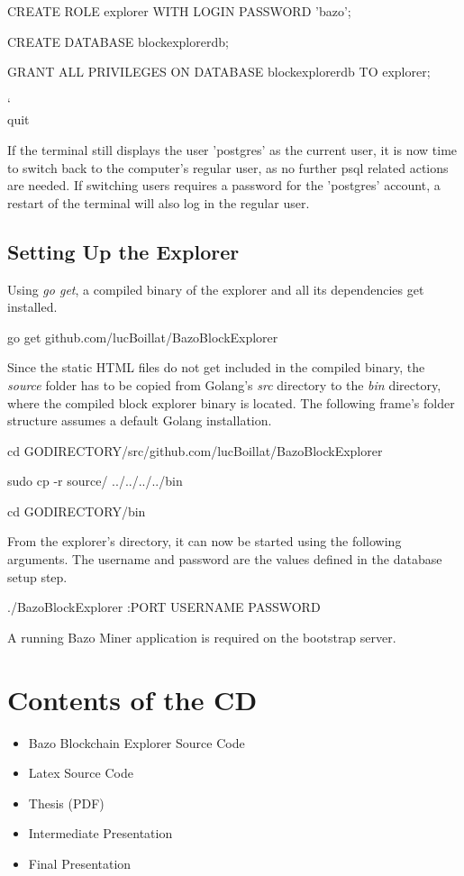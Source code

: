 \begin{framed}
CREATE ROLE explorer WITH LOGIN PASSWORD 'bazo';

CREATE DATABASE blockexplorerdb;

GRANT ALL PRIVILEGES ON DATABASE blockexplorerdb TO explorer;

\char`\\quit
\end{framed}

If the terminal still displays the user 'postgres' as the current user, it is now time to switch back to the computer's regular user, as no further psql related actions are needed. If switching users requires a password for the 'postgres' account, a restart of the terminal will also log in the regular user.

\section{Setting Up the Explorer}

Using \emph{go get}, a compiled binary of the explorer and all its dependencies get installed.

\begin{framed}
go get github.com/lucBoillat/BazoBlockExplorer
\end{framed}

Since the static HTML files do not get included in the compiled binary, the \emph{source} folder has to be copied from Golang's \emph{src} directory to the \emph{bin} directory, where the compiled block explorer binary is located. The following frame's folder structure assumes a default Golang installation.

\begin{framed}
cd GODIRECTORY/src/github.com/lucBoillat/BazoBlockExplorer

sudo cp -r source/ ../../../../bin

cd GODIRECTORY/bin

\end{framed}

From the explorer's directory, it can now be started using the following arguments. The username and password are the values defined in the database setup step.
\begin{framed}
./BazoBlockExplorer :PORT USERNAME PASSWORD
\end{framed}

A running Bazo Miner application is required on the bootstrap server.

\chapter{Contents of the CD}

\begin{itemize}
\item Bazo Blockchain Explorer Source Code
\item Latex Source Code
\item Thesis (PDF)
\item Intermediate Presentation
\item Final Presentation
\end{itemize}